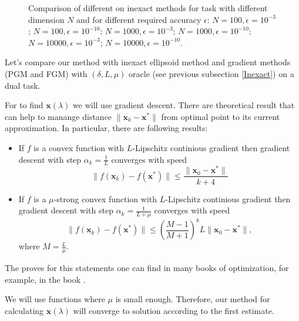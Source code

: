 \documentclass[12pt]{article}
\begin{document}
\begin{figure}[ht!]
\hspace{2ex}
\hspace{2ex}
\caption{Comparison of different on inexact methods for task with different dimension $N$ and for different required accuracy $\epsilon$:  $N=100,\epsilon=10^{-3}$;  $N=100,\epsilon=10^{-10}$;  $N=1000,\epsilon=10^{-3}$;  $N=1000,\epsilon=10^{-10}$;  $N=10000,\epsilon=10^{-3}$;  $N=10000,\epsilon=10^{-10}$. } \label{fig:image}
\end{figure}

Let's compare our method with inexact ellipsoid method and gradient methods (PGM and FGM) with $(\delta, L,\mu)$ oracle (see previous subsection \ref{Inexact}) on a dual task.

For to find $\textbf{x}(\lambda)$ we will use gradient descent. There are theoretical result that can help to manange distance $\|\textbf{x}_k-\textbf{x}^*\|$ from optimal point to its current approximation. In particular, there are following results:
\begin{itemize}
\item If $f$ is a convex function with $L$-Lipschitz continious gradient then gradient descent with step $\alpha_k = \frac{1}{L}$ converges with speed
$$\|f(\textbf{x}_k)-f(\textbf{x}^*)\|\leq \frac{\|\textbf{x}_0-\textbf{x}^*\|}{k+4}$$
\item If $f$ is a $\mu$-strong convex function with $L$-Lipschitz continious gradient then gradient descent with step $\alpha_k = \frac{1}{L+\mu}$ converges with speed
$$\|f(\textbf{x}_k)-f(\textbf{x}^*)\|\leq \left(\frac{M-1}{M+1}\right)^kL\|\textbf{x}_0-\textbf{x}^*\|,$$
where $M =\frac{L}{\mu}$.
\end{itemize}

The proves for this statements one can find in many books of optimization, for example, in the book \cite{Polyak}.

We will use functions where $\mu$ is small enough. Therefore, our method for calculating $\textbf{x}(\lambda)$ will converge to solution according to the first estimate.
\end{document}
